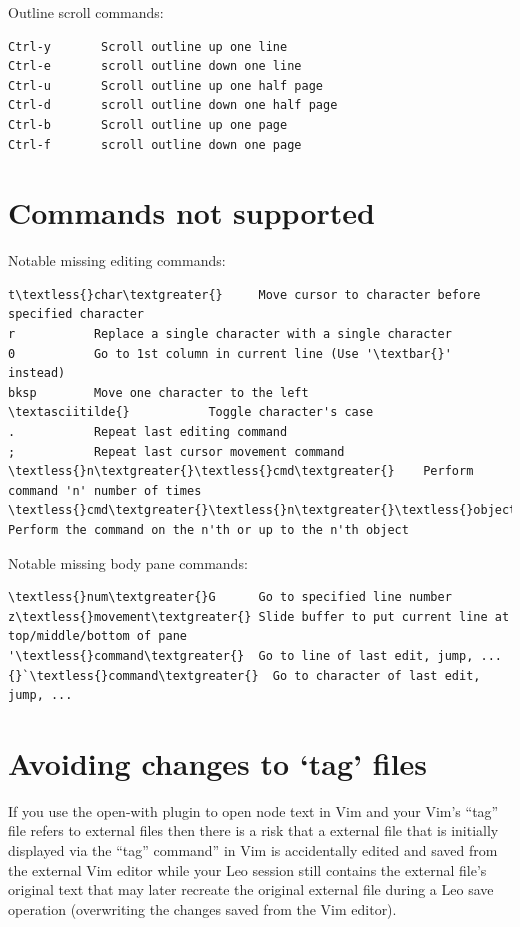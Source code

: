 \documentclass[a4paper,10pt,english]{sphinxmanual}
\begin{document}
Outline scroll commands:

\begin{Verbatim}[commandchars=\\\{\}]
Ctrl-y       Scroll outline up one line
Ctrl-e       scroll outline down one line
Ctrl-u       Scroll outline up one half page
Ctrl-d       scroll outline down one half page
Ctrl-b       Scroll outline up one page
Ctrl-f       scroll outline down one page
\end{Verbatim}


\section{Commands not supported}
\label{vimBindings:commands-not-supported}
Notable missing editing commands:

\begin{Verbatim}[commandchars=\\\{\}]
t\textless{}char\textgreater{}     Move cursor to character before specified character
r           Replace a single character with a single character
0           Go to 1st column in current line (Use '\textbar{}' instead)
bksp        Move one character to the left
\textasciitilde{}           Toggle character's case
.           Repeat last editing command
;           Repeat last cursor movement command
\textless{}n\textgreater{}\textless{}cmd\textgreater{}    Perform command 'n' number of times
\textless{}cmd\textgreater{}\textless{}n\textgreater{}\textless{}object\textgreater{}    Perform the command on the n'th or up to the n'th object
\end{Verbatim}

Notable missing body pane commands:

\begin{Verbatim}[commandchars=\\\{\}]
\textless{}num\textgreater{}G      Go to specified line number
z\textless{}movement\textgreater{} Slide buffer to put current line at top/middle/bottom of pane
'\textless{}command\textgreater{}  Go to line of last edit, jump, ...
{}`\textless{}command\textgreater{}  Go to character of last edit, jump, ...
\end{Verbatim}


\section{Avoiding changes to `tag' files}
\label{vimBindings:avoiding-changes-to-tag-files}
If you use the open-with plugin to open node text in Vim and your Vim's ``tag''
file refers to external files then there is a risk that a external file that is
initially displayed via the ``tag'' command'' in Vim is accidentally edited and
saved from the external Vim editor while your Leo session still contains the
external file's original text that may later recreate the original external file
during a Leo save operation (overwriting the changes saved from the Vim editor).
\end{document}
